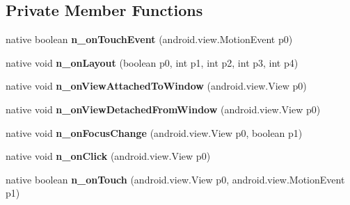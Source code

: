 \subsection*{Private Member Functions}
\begin{DoxyCompactItemize}
\item 
\mbox{\label{classmd57018357d52b54713cd814fbd5262dd1f_1_1ButtonRenderer_a3cb39749501d7b1e24a4e414d3eedcfd}} 
native boolean {\bfseries n\+\_\+on\+Touch\+Event} (android.\+view.\+Motion\+Event p0)
\item 
\mbox{\label{classmd57018357d52b54713cd814fbd5262dd1f_1_1ButtonRenderer_ab9f917e4f7827eafdb2630fe8dbf09ab}} 
native void {\bfseries n\+\_\+on\+Layout} (boolean p0, int p1, int p2, int p3, int p4)
\item 
\mbox{\label{classmd57018357d52b54713cd814fbd5262dd1f_1_1ButtonRenderer_a48f8e843fa3c1bb9a90cd884d614ce2a}} 
native void {\bfseries n\+\_\+on\+View\+Attached\+To\+Window} (android.\+view.\+View p0)
\item 
\mbox{\label{classmd57018357d52b54713cd814fbd5262dd1f_1_1ButtonRenderer_a4a6b7e452049dfdcd953991b67111f7f}} 
native void {\bfseries n\+\_\+on\+View\+Detached\+From\+Window} (android.\+view.\+View p0)
\item 
\mbox{\label{classmd57018357d52b54713cd814fbd5262dd1f_1_1ButtonRenderer_acafdc35bd214953c92f41b73511cf15b}} 
native void {\bfseries n\+\_\+on\+Focus\+Change} (android.\+view.\+View p0, boolean p1)
\item 
\mbox{\label{classmd57018357d52b54713cd814fbd5262dd1f_1_1ButtonRenderer_a444e04ce6573dd09967b25af7df43b31}} 
native void {\bfseries n\+\_\+on\+Click} (android.\+view.\+View p0)
\item 
\mbox{\label{classmd57018357d52b54713cd814fbd5262dd1f_1_1ButtonRenderer_af3e5d1d8c20e5cb8535eab5444718717}} 
native boolean {\bfseries n\+\_\+on\+Touch} (android.\+view.\+View p0, android.\+view.\+Motion\+Event p1)
\end{DoxyCompactItemize}
